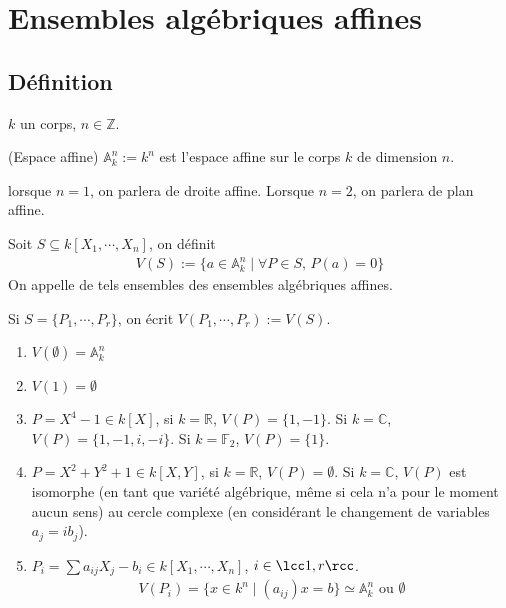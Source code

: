
    \chapter{Ensembles algébriques affines}
        \section{Définition}
            $k$ un corps, $n \in \mathbb{Z}$.
            \begin{defi} (Espace affine)
                $\mathbb{A}^n_k := k^n$ est l'espace affine sur le corps $k$ de dimension $n$.
            \end{defi}
            lorsque $n = 1$, on parlera de droite affine. Lorsque $n = 2$, on parlera de plan affine.
            \begin{defi}
                Soit $S \subseteq k[X_1, \cdots, X_n]$, on définit
                \begin{align*}
                    V(S) := \{a \in \mathbb{A}_k^n \mid \forall P \in S ,\, P(a) = 0 \}
                \end{align*}
                On appelle de tels ensembles des ensembles algébriques affines.
            \end{defi}
            \begin{remq}
                Si $S = \{P_1, \cdots, P_r\}$, on écrit $V(P_1, \cdots, P_r) := V(S)$.
            \end{remq}
            \begin{expl}
                \begin{enumerate}
                    \item $V(\emptyset) = \mathbb{A}_k^n$
                    \item $V(1) = \emptyset$
                    \item $P = X^4 - 1 \in k[X]$, si $k = \mathbb{R}$, $V(P) = \{1, -1\}$. Si $k = \mathbb{C}$, $V(P) = \{1,-1,i,-i\}$. Si $k = \mathbb{F}_2$, $V(P) = \{1\}$.
                    \item $P = X^2 + Y^2 + 1 \in k[X,Y]$, si $k = \mathbb{R}$, $V(P) = \emptyset$. Si $k = \mathbb{C}$, $V(P)$ est isomorphe (en tant que variété algébrique, même si cela n'a pour le moment aucun sens) au cercle complexe (en considérant le changement de variables $a_j = ib_j$).
                    \item $P_i = \sum a_{ij} X_j - b_i \in k[X_1, \cdots, X_n]$, $i \in \lcc 1,r \rcc$.
                    \begin{align*}
                        V(P_i) = \{x \in k^n \mid (a_{ij})x = b\} \simeq \mathbb{A}_k^n \text{ ou } \emptyset
                    \end{align*}
                \end{enumerate}
            \end{expl}
